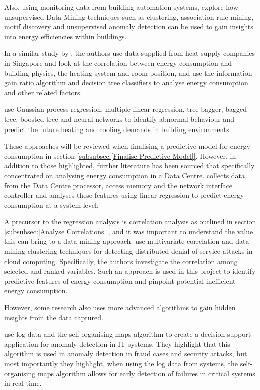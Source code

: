 \documentclass[12pt]{scrartcl}
\begin{document}
Also, using monitoring data from building automation systems, \citet{FAN2018296} explore how unsupervised Data Mining techniques such as clustering, association rule mining, motif discovery and unsupervised anomaly detection can be used to gain insights into energy efficiencies within buildings. 

In a similar study by \citet{ZHOU201873}, the authors use data supplied from heat supply companies in Singapore and look at the correlation between energy consumption and building physics, the heating system and room position, and use the information gain ratio algorithm and decision tree classifiers to analyse energy consumption and other related factors. 

\citet{AHMAD2018460} use Gaussian process regression, multiple linear regression, tree bagger, bagged tree, boosted tree and neural networks to identify abnormal behaviour and predict the future heating and cooling demands in building environments. 

These approaches will be reviewed when finalising a predictive model for energy consumption in section \ref{subsubsec:[Finalise Predictive Model]}. However, in addition to those highlighted, further literature has been sourced that specifically concentrated on analysing energy consumption in a Data Centre. \citep{Makris2017} collects data from the Data Centre processor, access memory and the network interface controller and analyses these features using linear regression to predict energy consumption at a system-level.

A precursor to the regression analysis is correlation analysis as outlined in section \ref{subsubsec:[Analyse Correlations]}, and it was important to understand the value this can bring to a data mining approach. \citep{13375977120180401} use multivariate correlation and data mining clustering techniques for detecting distributed denial of service attacks in cloud computing. Specifically, the authors investigate the correlation among selected and ranked variables. Such an approach is used in this project to identify predictive features of energy consumption and pinpoint potential inefficient energy consumption.    

However, some research also uses more advanced algorithms to gain hidden insights from the data captured. 

\citet{13090171620180801} use log data and the self-organising maps algorithm to create a decision support application for anomaly detection in IT systems. They highlight that this algorithm is used in anomaly detection in fraud cases and security attacks, but most importantly they highlight, when using the log data from systems, the self-organising maps algorithm allows for early detection of failures in critical systems in real-time. 
\end{document}
